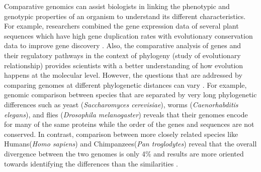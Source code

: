 Comparative genomics can assist biologists in linking the phenotypic and genotypic properties of an organism to understand its different characteristics. For example, researchers combined the gene expression data of several plant sequences which have high gene duplication rates with evolutionary conservation data to improve gene discovery \cite{hanada2008importance}. Also, the comparative analysis of genes and their regulatory pathways in the context of phylogeny (study of evolutionary relationship) provides scientists with a better understanding of how evolution happens at the molecular level\cite{soltis2003role}. However, the questions that are addressed by comparing genomes at different phylogenetic distances can vary \cite{hardison2003comparative}. For example, genomic comparison between species that are separated by very long phylogenetic differences such as yeast (\textit{Saccharomyces cerevisiae}), worms (\textit{Caenorhabditis
elegans}), and flies (\textit{Drosophila melanogaster}) reveals that their genomes encode for many of the same proteins while the order of the genes and sequences are not conserved\cite{rubin2000comparative}. In contrast, comparison between more closely related species like Humans(\textit{Homo sapiens}) and Chimpanzees(\textit{Pan troglodytes}) reveal that the overall divergence between the two genomes is only 4\% and results are more oriented towards identifying the differences than the similarities \cite{varki2005comparing}. 

